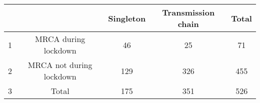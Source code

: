 \begin{tabular}{lcccc}
  \hline
 &  & Singleton & Transmission chain & Total \\ 
  \hline
1 & MRCA during lockdown &  46 &  25 &  71 \\ 
  2 & MRCA not during lockdown & 129 & 326 & 455 \\ 
  3 & Total & 175 & 351 & 526 \\ 
   \hline
\end{tabular}
